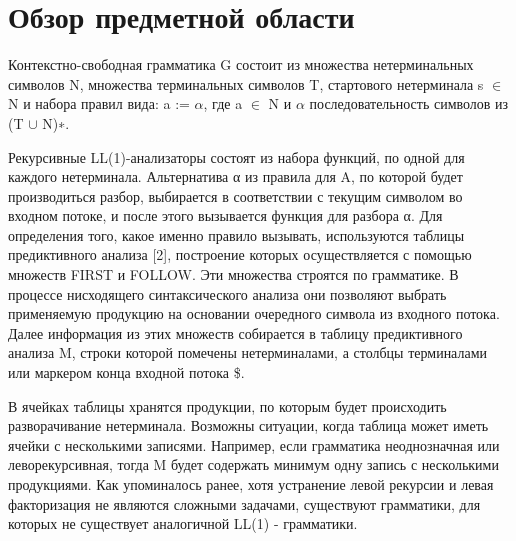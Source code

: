 \section{Обзор предметной области}
Контекстно-свободная грамматика G состоит из множества нетерминальных символов N, множества терминальных символов T, стартового нетерминала s $\in$ N  и набора правил вида:  a := $\alpha$, где a $\in$ N и $\alpha$ последовательность символов из  (T $\cup$ N)∗.

Рекурсивные LL(1)-анализаторы состоят из набора функций, по одной для каждого нетерминала. Альтернатива α из правила для A,  по которой будет производиться разбор, выбирается в соответствии с текущим символом во входном потоке,  и после этого вызывается функция для разбора α. Для определения того, какое именно правило вызывать, используются таблицы предиктивного анализа [2], построение которых осуществляется с помощью множеств FIRST и FOLLOW. Эти множества строятся по грамматике. В процессе нисходящего синтаксического анализа они позволяют выбрать применяемую продукцию на основании очередного символа из входного потока. Далее информация из этих множеств собирается в таблицу предиктивного анализа M, строки которой помечены нетерминалами, а столбцы терминалами или маркером конца входной потока \$.

В ячейках таблицы хранятся продукции, по которым будет происходить разворачивание нетерминала. Возможны ситуации, когда таблица может иметь ячейки с несколькими записями. Например, если грамматика неоднозначная или леворекурсивная, тогда M будет содержать минимум одну запись с несколькими продукциями. Как упоминалось ранее, хотя устранение левой рекурсии и левая факторизация не являются сложными задачами, существуют  грамматики, для которых не существует аналогичной LL(1) - грамматики.

